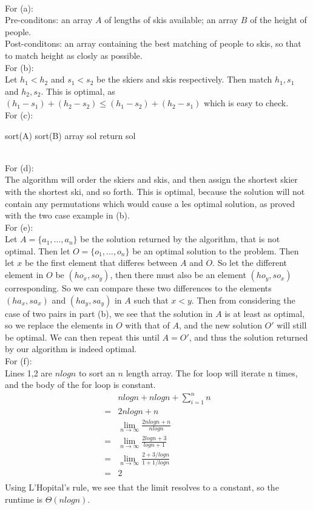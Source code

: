 \documentclass{assignment}
\begin{document}
\begin{problemlist}
\begin{problem}
\end{problem}
\begin{answer}
\\
For (a):\\
Pre-conditons: an array $A$ of lengths of skis available; an array $B$ of the height of people.\\
Post-conditons: an array containing the best matching of people to skis, so that to match height as closly as possible.\\
For (b):\\
Let $h_1<h_2$ and $s_1<s_2$ be the skiers and skis respectively. Then match $h_1,s_1$ and $h_2,s_2$. This is optimal, as $(h_1-s_1)+(h_2-s_2) \le (h_1-s_2)+(h_2-s_1)$ which is easy to check.\\
For (c):\\
\begin{algorithm}
  sort(A)\;
  sort(B)\;
  array sol\;
  return sol\;
\end{algorithm}
\\For (d):\\
The algorithm will order the skiers and skis, and then assign the shortest skier with the shortest ski, and so forth. This is optimal, because the solution will not contain any permutations which would cause a les optimal solution, as proved with the two case example in (b).\\
For (e):\\
Let $A=\{a_1,\ldots,a_n\}$ be the solution returned by the algorithm, that is not optimal. Then let $O=\{o_1,\ldots,o_n\}$ be an optimal solution to the problem. Then let $x$ be the first element that differes between $A$ and $O$. So let the different element in $O$ be $(ho_x,so_y)$, then there must also be an element $(ho_y,so_x)$ corresponding. So we can compare these two differences to the elements $(ha_x,sa_x)$ and $(ha_y,sa_y)$ in $A$ such that $x<y$. Then from considering the case of two pairs in part (b), we see that the solution in $A$ is at least as optimal, so we replace the elements in $O$ with that of $A$, and the new solution $O'$ will still be optimal. We can then repeat this until $A=O'$, and thus the solution returned by our algorithm is indeed optimal.\\
For (f):\\
Lines 1,2 are $nlogn$ to sort an $n$ length array. The for loop will iterate n times, and the body of the for loop is constant.
\begin{align*}
&nlogn + nlogn + \sum_{i=1}^{n} n\\
=&2nlogn + n\\
&\lim_{n\rightarrow \infty} \frac{2nlogn+n}{nlogn}\\
=&\lim_{n\rightarrow \infty} \frac{2logn+3}{logn+1}\\
=&\lim_{n\rightarrow \infty} \frac{2+3/logn}{1+1/logn}\\
=&2\\
\end{align*}
Using L'Hopital's rule, we see that the limit resolves to a constant, so the runtime is $\Theta (nlogn)$.\\
\end{answer}

\end{problemlist}
\end{document}
